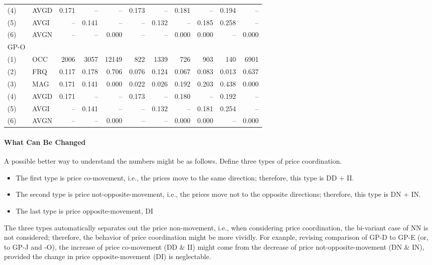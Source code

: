 \begin{table}[H]
\begin{tabular}{llrrrrrrrrr}
		(4)  & AVGD & 0.171 &    -- &    -- & 0.173 &    -- & 0.181 &    -- & 0.194 &     -- \\
		(5)  & AVGI &    -- & 0.141 &    -- &    -- & 0.132 &    -- & 0.185 & 0.258 &     -- \\
		(6)  & AVGN &    -- &    -- & 0.000 &    -- &    -- & 0.000 & 0.000 &    -- &  0.000 \\ \hline
		GP-O &      &       &       &       &       &       &       &       &       &        \\
		(1)  & OCC  &  2006 &  3057 & 12149 &   822 &  1339 &   726 &   903 &   140 &   6901 \\
		(2)  & FRQ  & 0.117 & 0.178 & 0.706 & 0.076 & 0.124 & 0.067 & 0.083 & 0.013 &  0.637 \\
		(3)  & MAG  & 0.171 & 0.141 & 0.000 & 0.022 & 0.026 & 0.192 & 0.203 & 0.438 &  0.000 \\
		(4)  & AVGD & 0.171 &    -- &    -- & 0.173 &    -- & 0.180 &    -- & 0.192 &     -- \\
		(5)  & AVGI &    -- & 0.141 &    -- &    -- & 0.132 &    -- & 0.181 & 0.254 &     -- \\
		(6)  & AVGN &    -- &    -- & 0.000 &    -- &    -- & 0.000 & 0.000 &    -- &  0.000 \\ \hline\hline
	\end{tabular}
\end{table}

\paragraph{What Can Be Changed}

A possible better way to understand the numbers might be as follows. Define three types of price coordination.
\begin{itemize}
	\item The first type is price co-movement, i.e., the prices move to the same direction; therefore, this type is DD + II.
	\item The second type is price not-opposite-movement, i.e., the prices move not to the opposite directions; therefore, this type is DN + IN.
	\item The last type is price opposite-movement, DI
\end{itemize}
The three types automatically separates out the price non-movement, i.e., when considering price coordination, the bi-variant case of NN is not considered; therefore, the behavior of price coordination might be more vividly. For exanple, revising comparison of GP-D to GP-E (or, to GP-J and -O), the increase of price co-movement (DD \& II) might come from the decrease of price not-opposite-movement (DN \& IN), provided the change in price opposite-movement (DI) is neglectable.


